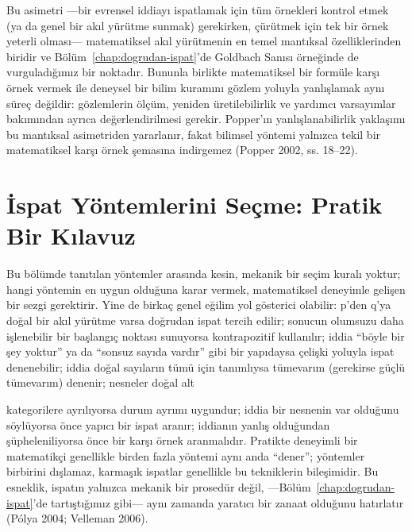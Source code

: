 Bu asimetri —bir evrensel iddiayı ispatlamak için tüm örnekleri kontrol etmek (ya da genel bir akıl yürütme sunmak) gerekirken, çürütmek için tek bir örnek yeterli olması— matematiksel akıl yürütmenin en temel mantıksal özelliklerinden biridir ve Bölüm~\ref{chap:dogrudan-ispat}’de Goldbach Sanısı örneğinde de vurguladığımız bir noktadır. Bununla birlikte matematiksel bir formüle karşı örnek vermek ile deneysel bir bilim kuramını gözlem yoluyla yanlışlamak aynı süreç değildir: gözlemlerin ölçüm, yeniden üretilebilirlik ve yardımcı varsayımlar bakımından ayrıca değerlendirilmesi gerekir. Popper’ın yanlışlanabilirlik yaklaşımı bu mantıksal asimetriden yararlanır, fakat bilimsel yöntemi yalnızca tekil bir matematiksel karşı örnek şemasına indirgemez (Popper 2002, ss. 18–22).

\section{İspat Yöntemlerini Seçme: Pratik Bir Kılavuz}

Bu bölümde tanıtılan yöntemler arasında kesin, mekanik bir seçim kuralı yoktur; hangi yöntemin en uygun olduğuna karar vermek, matematiksel deneyimle gelişen bir sezgi gerektirir. Yine de birkaç genel eğilim yol gösterici olabilir: p’den q’ya doğal bir akıl yürütme varsa doğrudan ispat tercih edilir; sonucun olumsuzu daha işlenebilir bir başlangıç noktası sunuyorsa kontrapozitif kullanılır; iddia “böyle bir şey yoktur” ya da “sonsuz sayıda vardır” gibi bir yapıdaysa çelişki yoluyla ispat denenebilir; iddia doğal sayıların tümü için tanımlıysa tümevarım (gerekirse güçlü tümevarım) denenir; nesneler doğal alt

kategorilere ayrılıyorsa durum ayrımı uygundur; iddia bir nesnenin var olduğunu söylüyorsa önce yapıcı bir ispat aranır; iddianın yanlış olduğundan şüpheleniliyorsa önce bir karşı örnek aranmalıdır. Pratikte deneyimli bir matematikçi genellikle birden fazla yöntemi aynı anda “dener”; yöntemler birbirini dışlamaz, karmaşık ispatlar genellikle bu tekniklerin bileşimidir. Bu esneklik, ispatın yalnızca mekanik bir prosedür değil, —Bölüm~\ref{chap:dogrudan-ispat}’de tartıştığımız gibi— aynı zamanda yaratıcı bir zanaat olduğunu hatırlatır (Pólya 2004; Velleman 2006).

